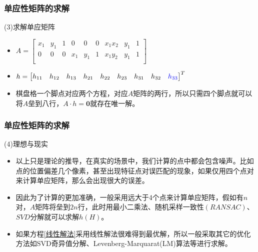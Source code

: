 \documentclass[aspectratio=43]{beamer}
\begin{document}
	\begin{frame}
		\frametitle{单应性矩阵的求解}
		\begin{block}{(3)求解单应矩阵}
			\begin{itemize}
				\item $A=\left[ \begin{matrix}
					x_1&		y_1&		1&		0&		0&		0&		x_1x_2&		y_1&		1\\
					0&		0&		0&		x_1&		y_1&		1&		x_1y_2&		y_1&		1\\
				\end{matrix} \right] $
				\item $h=\left[ \begin{matrix}
					h_{11}&		h_{12}&		h_{13}&		h_{21}&		h_{22}&		h_{23}&		h_{31}&		h_{32}&		{\color[RGB]{0, 0, 240} h_{33}}\\
				\end{matrix} \right] ^T$
				\vspace{0.8em}
				\item 棋盘格一个脚点对应两个方程，对应$A$矩阵的两行，所以只需四个脚点就可以将$A$垒到八行，$A\cdot h=\boldsymbol{0}$就存在唯一解。
			\end{itemize}
		\end{block}
	\end{frame}
	
	
	\begin{frame}
		\frametitle{单应性矩阵的求解}
		\begin{block}{(4)理想与现实}
			\begin{itemize}
				\item 以上只是理论的推导，在真实的场景中，我们计算的点中都会包含噪声。比如点的位置偏差几个像素，甚至出现特征点对误匹配的现象，如果仅用四个点对来计算单应矩阵，那么会出现很大的误差。
				\item  因此为了计算的更加准确，一般采用远大于4个点来计算单应矩阵，假如有$n$对，$A$矩阵将垒到$2n$行，此时用最小二乘法、随机采样一致性$(RANSAC)$、$SVD$分解就可以求解$h(H)$。
				\item 如果方程\ref{线性解法}采用线性解法很难得到最优解，所以一般采取其它的优化方法如SVD奇异值分解、Levenberg-Marquarat(LM)算法等进行求解。
			\end{itemize}
		\end{block}
	\end{frame}
	
\end{document}
